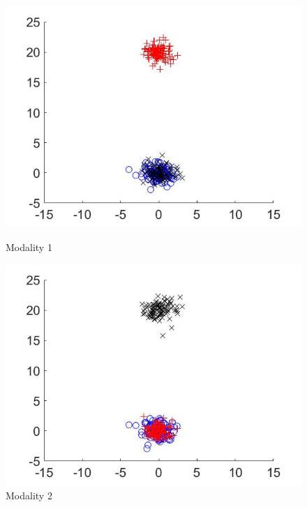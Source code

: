 \documentclass{beamer}
\begin{document}
\begin{frame}
\begin{figure}[ht]
\begin{minipage}[b]{0.30\linewidth}
      \includegraphics[width=\textwidth]{./Images/Synthetic/set1.jpg}
      \caption{Modality 1}
    \end{minipage}
    \begin{minipage}[b]{0.30\linewidth}
      \centering
      \includegraphics[width=\textwidth]{./Images/Synthetic/set2.jpg}
      \caption{Modality 2}
    \end{minipage}
    \label{fig:SynthData}
  \end{figure}
\end{frame}

\end{document}
